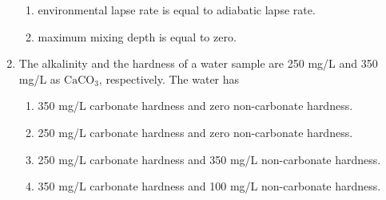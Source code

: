 \documentclass[journal]{IEEEtran}
\begin{document}
\begin{enumerate}
\begin{enumerate}
			\item environmental lapse rate is equal to adiabatic lapse rate.
			\item maximum mixing depth is equal to zero.
		\end{enumerate}
	\item 
	The alkalinity and the hardness of a water sample are 250 mg/L and 350 mg/L as $\text{CaCO}_3$, respectively. The water has 
		\begin{enumerate}
			\item 350 mg/L carbonate hardness and zero non-carbonate hardness.
			\item 250 mg/L carbonate hardness and zero non-carbonate hardness.
			\item 250 mg/L carbonate hardness and 350 mg/L non-carbonate hardness.
			\item 350 mg/L carbonate hardness and 100 mg/L non-carbonate hardness.
		\end{enumerate}
	
	







\end{enumerate}
\end{document}
